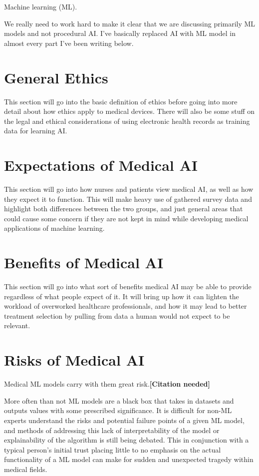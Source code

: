 \documentclass[]{article}
\begin{document}
		\medskip

		Machine learning (ML).

		We really need to work hard to make it clear that we are discussing primarily ML models and not procedural AI. I've basically replaced AI with ML model in almost every part I've been writing below.
		

	\section{General Ethics}
		This section will go into the basic definition of ethics before going into more detail about how ethics apply to medical devices. There will also be some stuff on the legal and ethical considerations of using electronic health records as training data for learning AI.

	\section{Expectations of Medical AI}
		This section will go into how nurses and patients view medical AI, as well as how they expect it to function. This will make heavy use of gathered survey data and highlight both differences between the two groups, and just general areas that could cause some concern if they are not kept in mind while developing medical applications of machine learning.

	\section{Benefits of Medical AI}
		This section will go into what sort of benefits medical AI may be able to provide regardless of what people expect of it. It will bring up how it can lighten the workload of overworked healthcare professionals, and how it may lead to better treatment selection by pulling from data a human would not expect to be relevant.

	\section{Risks of Medical AI}
		Medical ML models carry with them great risk.\textbf{[Citation needed]}

		More often than not ML models are a black box that takes in datasets and outputs values with some prescribed significance. It is difficult for non-ML experts understand the risks and potential failure points of a given ML model, and methods of addressing this lack of interpretability of the model or explainability of the algorithm is still being debated.\cite{10.1145/2858036.2858529, 10.1145/3328519.3329126} This in conjunction with a typical person's initial trust placing little to no emphasis on the actual functionality of a ML model\cite{siau2018building} can make for sudden and unexpected tragedy within medical fields.
\end{document}
